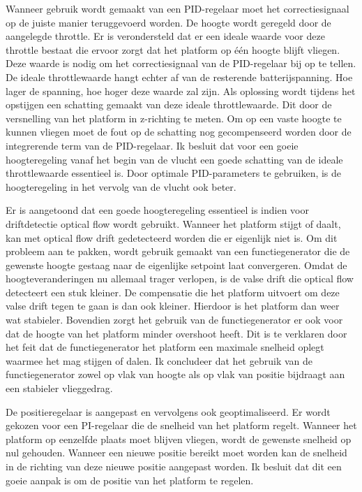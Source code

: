 \npar Wanneer gebruik wordt gemaakt van een PID-regelaar moet het correctiesignaal op de juiste manier teruggevoerd worden. De hoogte wordt geregeld door de aangelegde throttle. Er is verondersteld dat er een ideale waarde voor deze throttle bestaat die ervoor zorgt dat het platform op \'e\'en hoogte blijft vliegen. Deze waarde is nodig om het correctiesignaal van de PID-regelaar bij op te tellen. De ideale throttlewaarde hangt echter af van de resterende batterijspanning. Hoe lager de spanning, hoe hoger deze waarde zal zijn. Als oplossing wordt tijdens het opstijgen een schatting gemaakt van deze ideale throttlewaarde. Dit door de versnelling van het platform in z-richting te meten. Om op een vaste hoogte te kunnen vliegen moet de fout op de schatting nog gecompenseerd worden door de integrerende term van de PID-regelaar. Ik besluit dat voor een goeie hoogteregeling vanaf het begin van de vlucht een goede schatting van de ideale throttlewaarde essentieel is. Door optimale PID-parameters te gebruiken, is de hoogteregeling in het vervolg van de vlucht ook beter.

\npar Er is aangetoond dat een goede hoogteregeling essentieel is indien voor driftdetectie optical flow wordt gebruikt. Wanneer het platform stijgt of daalt, kan met optical flow drift gedetecteerd worden die er eigenlijk niet is. Om dit probleem aan te pakken, wordt gebruik gemaakt van een functiegenerator die de gewenste hoogte gestaag naar de eigenlijke setpoint laat convergeren. Omdat de hoogteveranderingen nu allemaal trager verlopen, is de valse drift die optical flow detecteert een stuk kleiner. De compensatie die het platform uitvoert om deze valse drift tegen te gaan is dan ook kleiner. Hierdoor is het platform dan weer wat stabieler. Bovendien zorgt het gebruik van de functiegenerator er ook voor dat de hoogte van het platform minder overshoot heeft. Dit is te verklaren door het feit dat de functiegenerator het platform een maximale snelheid oplegt waarmee het mag stijgen of dalen. Ik concludeer dat het gebruik van de functiegenerator zowel op vlak van hoogte als op vlak van positie bijdraagt aan een stabieler vlieggedrag.

\npar De positieregelaar is aangepast en vervolgens ook geoptimaliseerd. Er wordt gekozen voor een PI-regelaar die de snelheid van het platform regelt. Wanneer het platform op eenzelfde plaats moet blijven vliegen, wordt de gewenste snelheid op nul gehouden. Wanneer een nieuwe positie bereikt moet worden kan de snelheid in de richting van deze nieuwe positie aangepast worden. Ik besluit dat dit een goeie aanpak is om de positie van het platform te regelen.

